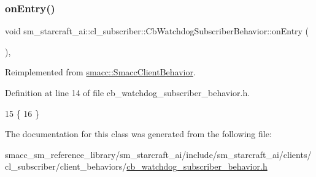 \subsubsection{\texorpdfstring{on\+Entry()}{onEntry()}}
{\footnotesize\ttfamily void sm\+\_\+starcraft\+\_\+ai\+::cl\+\_\+subscriber\+::\+Cb\+Watchdog\+Subscriber\+Behavior\+::on\+Entry (\begin{DoxyParamCaption}{ }\end{DoxyParamCaption})\hspace{0.3cm}{\ttfamily [inline]}, {\ttfamily [virtual]}}



Reimplemented from \hyperlink{classsmacc_1_1SmaccClientBehavior_ad5d3e1f1697c3cfe66c94cadba948493}{smacc\+::\+Smacc\+Client\+Behavior}.



Definition at line 14 of file cb\+\_\+watchdog\+\_\+subscriber\+\_\+behavior.\+h.


\begin{DoxyCode}
15     \{
16     \}
\end{DoxyCode}


The documentation for this class was generated from the following file\+:\begin{DoxyCompactItemize}
\item 
smacc\+\_\+sm\+\_\+reference\+\_\+library/sm\+\_\+starcraft\+\_\+ai/include/sm\+\_\+starcraft\+\_\+ai/clients/cl\+\_\+subscriber/client\+\_\+behaviors/\hyperlink{sm__starcraft__ai_2include_2sm__starcraft__ai_2clients_2cl__subscriber_2client__behaviors_2cb__wdfb3e50077225b2325e3a32b4e37e7e5}{cb\+\_\+watchdog\+\_\+subscriber\+\_\+behavior.\+h}\end{DoxyCompactItemize}

